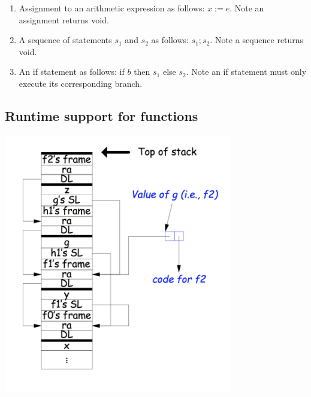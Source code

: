 \documentclass[a4paper]{article}
\theoremstyle{definition}
\begin{document}
\begin{enumerate}
  \item Assignment to an arithmetic expression as follows: $x:=e$. Note an assignment returns void.
  \item A sequence of statements $s_{1}$ and $s_{2}$ as follows: $s_{1} ; s_{2} .$ Note a sequence returns void.
  \item An if statement as follows: if $b$ then $s_{1}$ else $s_{2} .$ Note an if statement must only execute its corresponding branch.
\end{enumerate}

\subsection{Runtime support for functions}
\includegraphics[width=10cm]{img/Snipaste_2021-05-17_17-51-44.png}
\end{document}
